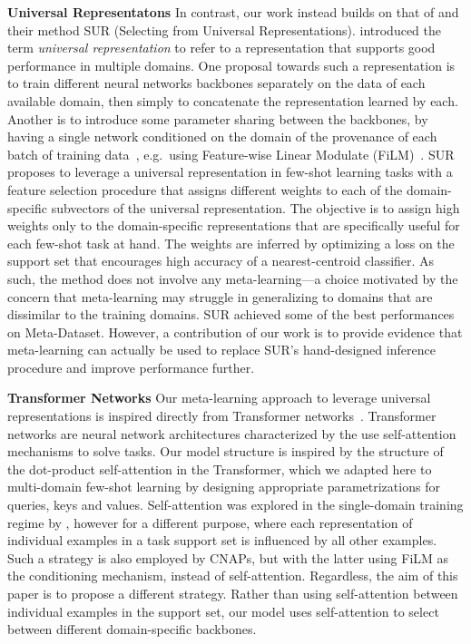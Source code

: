 \documentclass{article}
\begin{document}
{\bf Universal Representatons} In contrast, our work instead builds on that of \citet{dvornik2020selecting} and their method SUR (Selecting from Universal Representations). \citet{BilenH2017} introduced the term {\it universal representation} to refer to a representation that supports good performance in multiple domains. One proposal towards such a representation is to train different neural networks backbones separately on the data of each available domain, then simply to concatenate the representation learned by each. Another is to introduce some parameter sharing between the backbones, by having a single network conditioned on the domain of the provenance of each batch of training data~\cite{RebuffiS2018}, e.g.\ using Feature-wise Linear Modulate (FiLM)~\cite{film2018}.
SUR proposes to leverage a universal representation in few-shot learning tasks with a feature selection procedure that assigns different weights to each of the domain-specific subvectors of the universal representation. The objective is to assign high weights only to the domain-specific representations that are specifically useful for each few-shot task at hand. The weights are inferred by optimizing a loss  on the support set that encourages high accuracy of a nearest-centroid classifier. As such, the method does not involve any meta-learning---a choice motivated by the concern that  meta-learning may struggle in generalizing to domains that are dissimilar to the training domains. 
SUR achieved some of the best performances on Meta-Dataset. However, a contribution of our work is to provide evidence that meta-learning can actually be used to replace SUR's hand-designed inference procedure and improve performance further.

{\bf Transformer Networks} Our meta-learning approach to leverage universal representations is inspired directly from Transformer networks~\cite{vaswani2017attention}. Transformer networks are neural network architectures characterized by the use self-attention mechanisms to solve tasks. Our model structure is inspired by the structure of the dot-product self-attention in the Transformer, which we adapted here to multi-domain few-shot learning by designing appropriate parametrizations for queries, keys and values. Self-attention was explored in the single-domain training regime by \citet{YeH2020}, however for a different purpose, where each representation of individual examples in a task support set is influenced by all other examples. Such a strategy is also employed by CNAPs, but with the latter using FiLM as the conditioning mechanism, instead of self-attention.
Regardless, the aim of this paper is to propose a different strategy.  
Rather than using self-attention between individual examples in the support set, our model uses self-attention to select between different domain-specific backbones.
\end{document}
